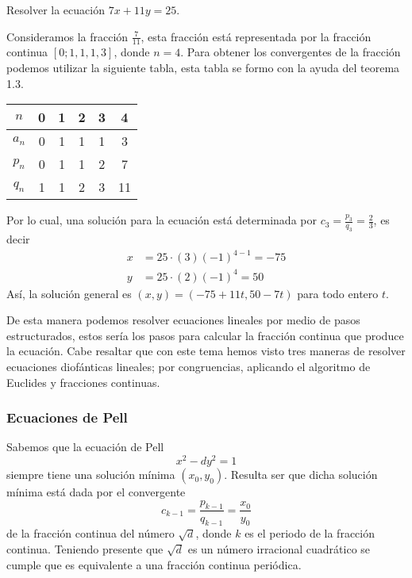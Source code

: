 \begin{example}
    Resolver la ecuación $7x + 11y = 25$.
\end{example}
\begin{solution}
    Consideramos la fracción $\frac{7}{11}$, esta fracción está representada por la fracción continua $[0;1,1,1,3]$, donde $n = 4$.
    Para obtener los convergentes de la fracción podemos utilizar la siguiente tabla, esta tabla se formo con la ayuda del teorema 1.3.
    \begin{table}[H]
        \centering
        \begin{tabular}{c||c|c|c|c|c}
            $n$ & 0 & 1 & 2 & 3 & 4 \\\hline\hline
            $a_n$ & 0 & 1 & 1 & 1 & 3\\
            $p_n$ & 0 & 1 & 1 & 2 & 7\\
            $q_n$ & 1 & 1 & 2 & 3 & 11\\
        \end{tabular}
    \end{table}
    Por lo cual, una solución para la ecuación está determinada por $c_3 = \frac{p_3}{q_3} = \frac{2}{3}$, es decir
    \begin{align*}
        x & = 25 \cdot (3) (-1)^{4 - 1} = -75 \\
        y & = 25 \cdot (2) (-1)^{4} = 50
    \end{align*}
    Así, la solución general es $(x,y) = (-75 +11t, 50 - 7t)$ para todo entero $t$.
\end{solution}

De esta manera podemos resolver ecuaciones lineales por medio de pasos estructurados, estos sería los pasos para
calcular la fracción continua que produce la ecuación.
Cabe resaltar que con este tema hemos visto tres maneras de resolver ecuaciones diofánticas lineales; por congruencias, aplicando el algoritmo de Euclides y fracciones continuas.

\subsubsection{Ecuaciones de Pell}

Sabemos que la ecuación de Pell
\[
    x^2 - d y^2 = 1
\]
siempre tiene una solución mínima $(x_0, y_0)$.
Resulta ser que dicha solución mínima está dada por el convergente
\[
    c_{k - 1} = \frac{p_{k - 1}}{q_{k - 1}} = \frac{x_0}{y_0}
\]
de la fracción continua del número $\sqrt {d}$,
donde $k$ es el periodo de la fracción continua.
Teniendo presente que $\sqrt {d}$ es un número irracional cuadrático se cumple que es equivalente a una fracción continua periódica.

